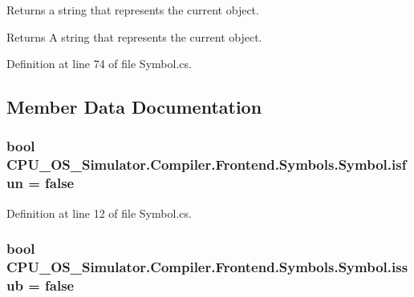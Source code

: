 Returns a string that represents the current object. 

\begin{DoxyReturn}{Returns}
A string that represents the current object. 
\end{DoxyReturn}


Definition at line 74 of file Symbol.\+cs.



\subsection{Member Data Documentation}
\hypertarget{class_c_p_u___o_s___simulator_1_1_compiler_1_1_frontend_1_1_symbols_1_1_symbol_af134735e9120e587a167e421c7395d17}{}
\subsubsection[{isfun}]{\setlength{\rightskip}{0pt plus 5cm}bool C\+P\+U\+\_\+\+O\+S\+\_\+\+Simulator.\+Compiler.\+Frontend.\+Symbols.\+Symbol.\+isfun = false\hspace{0.3cm}{\ttfamily [protected]}}\label{class_c_p_u___o_s___simulator_1_1_compiler_1_1_frontend_1_1_symbols_1_1_symbol_af134735e9120e587a167e421c7395d17}


Definition at line 12 of file Symbol.\+cs.

\hypertarget{class_c_p_u___o_s___simulator_1_1_compiler_1_1_frontend_1_1_symbols_1_1_symbol_aab1b4c85076aaa90f5f7c805315db9a3}{}
\subsubsection[{issub}]{\setlength{\rightskip}{0pt plus 5cm}bool C\+P\+U\+\_\+\+O\+S\+\_\+\+Simulator.\+Compiler.\+Frontend.\+Symbols.\+Symbol.\+issub = false\hspace{0.3cm}{\ttfamily [protected]}}\label{class_c_p_u___o_s___simulator_1_1_compiler_1_1_frontend_1_1_symbols_1_1_symbol_aab1b4c85076aaa90f5f7c805315db9a3}


